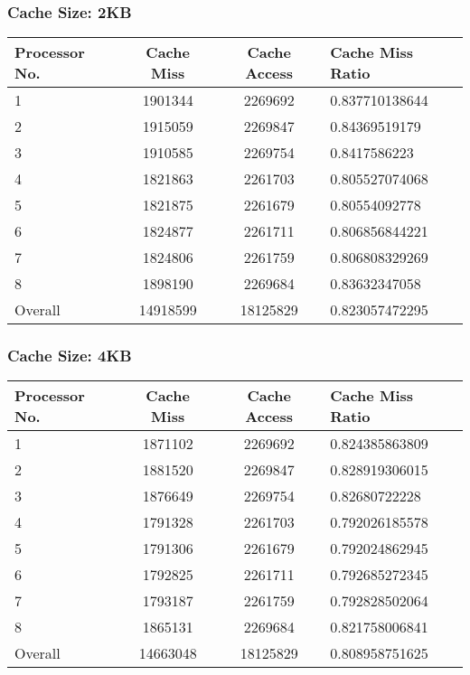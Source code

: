 \documentclass[]{article}
\begin{document}
\subsubsection{Cache Size: 2KB}
\begin{tabularx}{\textwidth}{ | l | c | c | X | }
\hline
Processor No.    & Cache Miss    & Cache Access  &   Cache Miss Ratio \\
\hline
1    & 1901344  & 2269692    & 0.837710138644 \\
\hline
2    & 1915059  & 2269847    & 0.84369519179 \\
\hline
3    & 1910585  & 2269754    & 0.8417586223 \\
\hline
4    & 1821863  & 2261703    & 0.805527074068 \\
\hline
5    & 1821875  & 2261679    & 0.80554092778 \\
\hline
6    & 1824877  & 2261711    & 0.806856844221 \\
\hline
7    & 1824806  & 2261759    & 0.806808329269 \\
\hline
8    & 1898190  & 2269684    & 0.83632347058 \\
\hline
Overall & 14918599    & 18125829  & 0.823057472295 \\
\hline
\end{tabularx}
\subsubsection{Cache Size: 4KB}
\begin{tabularx}{\textwidth}{ | l | c | c | X | }
\hline
Processor No.    & Cache Miss    & Cache Access  &   Cache Miss Ratio \\
\hline
1    & 1871102  & 2269692    & 0.824385863809 \\
\hline
2    & 1881520  & 2269847    & 0.828919306015 \\
\hline
3    & 1876649  & 2269754    & 0.82680722228 \\
\hline
4    & 1791328  & 2261703    & 0.792026185578 \\
\hline
5    & 1791306  & 2261679    & 0.792024862945 \\
\hline
6    & 1792825  & 2261711    & 0.792685272345 \\
\hline
7    & 1793187  & 2261759    & 0.792828502064 \\
\hline
8    & 1865131  & 2269684    & 0.821758006841 \\
\hline
Overall & 14663048    & 18125829  & 0.808958751625 \\
\hline
\end{tabularx}
\end{document}
